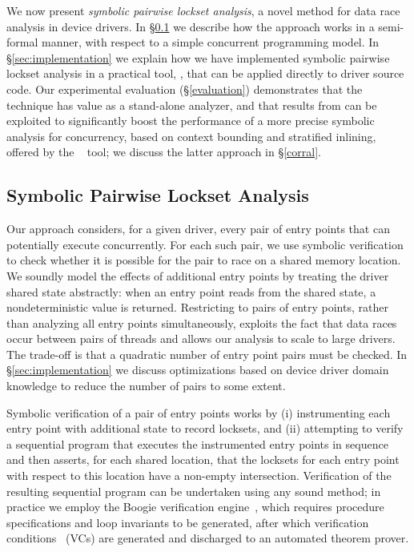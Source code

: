 
We now present \emph{symbolic pairwise lockset analysis}, a novel method for data race analysis in device drivers.  In \S\ref{sec:symbolicpairwise} we describe how the approach works in a semi-formal manner, with respect to a simple concurrent programming model.  In \S\ref{sec:implementation} we explain how we have implemented symbolic pairwise lockset analysis in a practical tool, \whoop, that can be applied directly to driver source code.
%
Our experimental evaluation (\S\ref{evaluation}) demonstrates that the \whoop technique has value as a stand-alone analyzer, and that results from \whoop can be exploited to significantly boost the performance of a more precise symbolic analysis for concurrency, based on context bounding and stratified inlining, offered by the \corral~\cite{lal2012corral} tool; we discuss the latter approach in \S\ref{corral}.

\subsection{Symbolic Pairwise Lockset Analysis}
\label{sec:symbolicpairwise}

Our approach considers, for a given driver, every pair of entry points that can potentially execute concurrently.  For each such pair, we use symbolic verification to check whether it is possible for the pair to race on a shared memory location. We soundly model the effects of additional entry points by treating the driver shared state abstractly: when an entry point reads from the shared state, a nondeterministic value is returned.  Restricting to pairs of entry points, rather than analyzing all entry points simultaneously, exploits the fact that data races occur between pairs of threads and allows our analysis to scale to large drivers.  The trade-off is that a quadratic number of entry point pairs must be checked.  In \S\ref{sec:implementation} we discuss optimizations based on device driver domain knowledge to reduce the number of pairs to some extent.

Symbolic verification of a pair of entry points works by (i) instrumenting each entry point with additional state to record locksets, and (ii) attempting to verify a sequential program that executes the instrumented entry points in sequence and then asserts, for each shared location, that the locksets for each entry point with respect to this location have a non-empty intersection.  Verification of the resulting sequential program can be undertaken using any sound method; in practice we employ the Boogie verification engine~\cite{barnett2006boogie}, which requires procedure specifications and loop invariants to be generated, after which verification conditions~\cite{barnett2005weakest} (VCs) are generated and discharged to an automated theorem prover.

